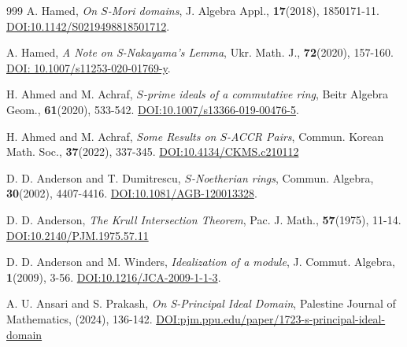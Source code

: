 \documentclass[11pt]{article}
\begin{document}
	\begin{thebibliography}{999}
		A. Hamed, \textit{On $S$-Mori domains}, J. Algebra Appl., \textbf{17}(2018), 1850171-11. \href{https://doi.org/10.1142/S0219498818501712}{DOI:10.1142/S0219498818501712}.
		
		 A. Hamed, \textit{A Note on S-Nakayama's Lemma}, Ukr. Math. J., \textbf{72}(2020), 157-160. \href{https://doi.org/10.1007/s11253-020-01769-y}{DOI: 10.1007/s11253-020-01769-y}. 
		
		H. Ahmed and M. Achraf, \textit{$S$-prime ideals of a commutative ring}, Beitr Algebra Geom., \textbf{61}(2020), 533-542. \href{https://doi.org/10.1007/s13366-019-00476-5}{DOI:10.1007/s13366-019-00476-5}.
        
		H. Ahmed and M. Achraf, \textit{Some Results on $S$-ACCR Pairs}, Commun. Korean Math. Soc., \textbf{37}(2022), 337-345. \href{https://doi.org/10.4134/CKMS.c210112}{DOI:10.4134/CKMS.c210112}
        
		D. D. Anderson and T. Dumitrescu, \textit{$S$-Noetherian rings},  Commun. Algebra,  \textbf{30}(2002), 4407-4416. \href{https://www.tandfonline.com/doi/full/10.1081/AGB-120013328}{DOI:10.1081/AGB-120013328}.
		
		D. D.  Anderson, \textit{The Krull Intersection Theorem}, Pac. J. Math., \textbf{57}(1975), 11-14. \href{https://msp.org/pjm/1975/57-1/p02.xhtml}{DOI:10.2140/PJM.1975.57.11}
		
		D. D. Anderson and M. Winders, \textit{Idealization of a module}, J. Commut. Algebra, \textbf{1}(2009), 3-56. \href{https://www.jstor.org/stable/26342937?casa_token=rPO841L4g5gAAAAA%3A8JnqgyWPUgYE-oJov7UUWkJVNoianx2Qwgh2JWOYUW4R-XkarP7i-bzhB431LepIukdVqE_evk-sYmQvP2eRgK_o3fuOKS9jTTxiu9LxkNSqs34vH1Yt&seq=1}{DOI:10.1216/JCA-2009-1-1-3}.
		
		A. U. Ansari and S. Prakash, \textit{On S-Principal Ideal Domain}, Palestine Journal of Mathematics, (2024), 136-142. \href{https://pjm.ppu.edu/paper/1723-s-principal-ideal-domain}{DOI:pjm.ppu.edu/paper/1723-s-principal-ideal-domain}
		
		
		

\end{thebibliography}
\end{document}
